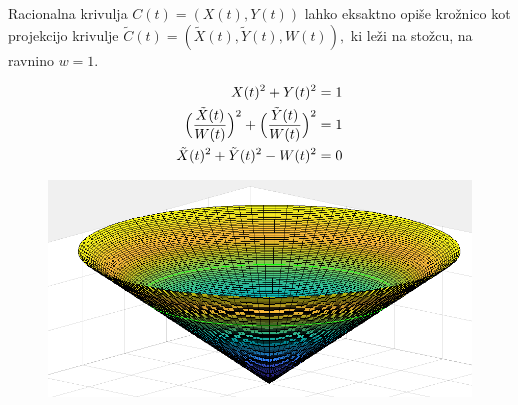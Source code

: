 \documentclass[t]{beamer}
\begin{document}
\begin{frame}
Racionalna krivulja $C(t) = (X(t), Y(t))$ lahko eksaktno opiše krožnico kot projekcijo krivulje
$\tilde{C}(t) = (\tilde{X}(t), \tilde{Y}(t), W(t)),$ ki leži na stožcu, na ravnino $w = 1$.

\begin{align*}
X(t)^2 + Y(t)^2 &= 1 \\
\Big{(}\frac{\tilde{X}(t)}{W(t)}\Big{)}^2 + \Big{(}\frac{\tilde{Y}(t)}{W(t)}\Big{)}^2 &= 1\\
\tilde{X}(t)^2 + \tilde{Y}(t)^2 - W(t)^2 &= 0
\end{align*}
\begin{figure}
\includegraphics[scale=0.2]{stozec.png}
\end{figure}

\end{frame}

\end{document}
